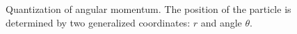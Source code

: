 \begin{figure}
\centering



\caption{Quantization of angular momentum. The position of the particle is determined
  by two generalized coordinates: $r$ and angle $\theta$.}
\label{figAddQuantAngleMoment}
\end{figure}